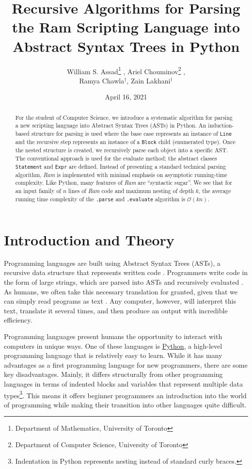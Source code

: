 \documentclass[11pt]{article}
\title{Recursive Algorithms for Parsing the Ram Scripting Language into Abstract Syntax Trees in Python}
\author{William S. Assad\footnote{Department of Mathematics, University of Toronto} , Ariel Chouminov\footnote{Department of Computer Science, University of Toronto} , \\ Ramya Chawla$^\dag$, Zain Lakhani$^\dag$}
\date{April 16, 2021}
\begin{document}
\maketitle

\begin{abstract}
    For the student of Computer Science, we introduce a systematic algorithm for parsing a new scripting language into Abstract Syntax Trees (ASTs) in Python. An induction-based structure for parsing is used where the base case represents an instance of \texttt{Line} and the recursive step represents an instance of a \texttt{Block} child (enumerated type). Once the nested structure is created, we recursively parse each object into a specific AST. The conventional approach is used for the evaluate method; the abstract classes \texttt{Statement} and \texttt{Expr} are defined. Instead of presenting a standard technical parsing algorithm, \emph{Ram} is implemented with minimal emphasis on asymptotic running-time complexity. Like Python, many features of \emph{Ram} are ``syntactic sugar''. We see that for an input family of $n$ lines of \emph{Ram} code and maximum nesting of depth $k$, the average running time complexity of the \texttt{.parse} and \texttt{.evaluate} algorithm is $\mathcal{O}(kn)$.
\end{abstract}

\section{Introduction and Theory}
Programming languages are built using Abstract Syntax Trees (ASTs), a recursive data structure that represents written code \cite{david}. Programmers write code in the form of large strings, which are parsed into ASTs and recursively evaluated \cite{david, ASTs}. As humans, we often take this necessary translation for granted, given that we can simply read programs as text \cite{david}. Any computer, however, will interpret this text, translate it several times, and then produce an output with incredible efficiency. 

Programming languages present humans the opportunity to interact with computers in unique ways. One of these languages is \href{https://www.python.org/}{Python}, a high-level programming language that is relatively easy to learn. While it has many advantages as a first programming language for new programmers, there are some key disadvantages. Mainly, it differs structurally from other programming languages in terms of indented blocks and variables that represent multiple data types\footnote{Indentation in Python represents nesting instead of standard curly braces.}. This means it offers beginner programmers an introduction into the world of programming while making their transition into other languages quite difficult. 
\end{document}
